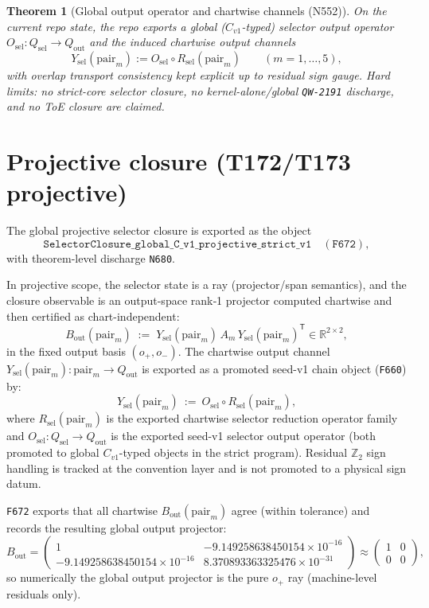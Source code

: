 \documentclass[11pt,a4paper]{article}
\newtheorem{theorem}{Theorem}[section]
\begin{document}
\begin{theorem}[Global output operator and chartwise channels (N552)]
On the current repo state, the repo exports a global ($C_{v1}$-typed) selector output operator $O_{\mathrm{sel}}:Q_{\mathrm{sel}}\to Q_{\mathrm{out}}$ and the induced chartwise output channels
\[
Y_{\mathrm{sel}}(\mathrm{pair}_m) := O_{\mathrm{sel}}\circ R_{\mathrm{sel}}(\mathrm{pair}_m)\qquad (m=1,\dots,5),
\]
with overlap transport consistency kept explicit up to residual sign gauge.
\emph{Hard limits:} no strict-core selector closure, no kernel-alone/global \texttt{QW-2191} discharge, and no ToE closure are claimed.
\end{theorem}
\section{Projective closure (T172/T173 projective)}

The global projective selector closure is exported as the object
\[
\texttt{SelectorClosure\_global\_C\_v1\_projective\_strict\_v1}\quad(\texttt{F672}),
\]
with theorem-level discharge \texttt{N680}.

In projective scope, the selector state is a ray (projector/span semantics), and the closure observable is an output-space rank‑1 projector
computed chartwise and then certified as chart-independent:
\[
B_{\mathrm{out}}(\mathrm{pair}_m)
\;:=\;
Y_{\mathrm{sel}}(\mathrm{pair}_m)\,A_m\,Y_{\mathrm{sel}}(\mathrm{pair}_m)^{\mathsf T}
\in\mathbb{R}^{2\times 2},
\]
in the fixed output basis $(o_+,o_-)$.
The chartwise output channel $Y_{\mathrm{sel}}(\mathrm{pair}_m):\mathrm{pair}_m\to Q_{\mathrm{out}}$ is exported as a promoted seed-v1 chain object (\texttt{F660}) by:
\[
Y_{\mathrm{sel}}(\mathrm{pair}_m)\ :=\ O_{\mathrm{sel}}\circ R_{\mathrm{sel}}(\mathrm{pair}_m),
\]
where $R_{\mathrm{sel}}(\mathrm{pair}_m)$ is the exported chartwise selector reduction operator family and $O_{\mathrm{sel}}:Q_{\mathrm{sel}}\to Q_{\mathrm{out}}$ is the exported seed-v1 selector output operator (both promoted to global $C_{v1}$-typed objects in the strict program).
Residual $\mathbb{Z}_2$ sign handling is tracked at the convention layer and is not promoted to a physical sign datum.

\texttt{F672} exports that all chartwise $B_{\mathrm{out}}(\mathrm{pair}_m)$ agree (within tolerance) and records the resulting global output projector:
\[
B_{\mathrm{out}}
=
\begin{pmatrix}
1 & -9.149258638450154\times 10^{-16}\\
-9.149258638450154\times 10^{-16} & 8.370893363325476\times 10^{-31}
\end{pmatrix}
\approx
\begin{pmatrix}
1 & 0\\
0 & 0
\end{pmatrix},
\]
so numerically the global output projector is the pure $o_+$ ray (machine-level residuals only).
\end{document}
